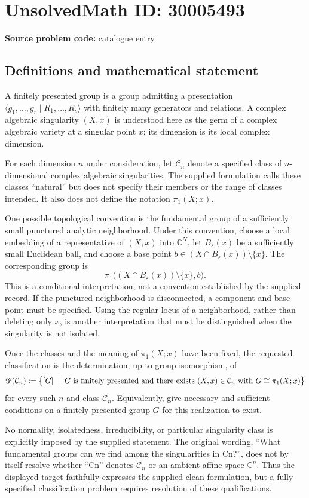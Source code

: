 \documentclass[11pt]{article}
\newcommand{\C}{\mathbb{C}}
\begin{document}
\section*{UnsolvedMath ID: 30005493}
\textbf{Source problem code:} catalogue entry
\subsection{Definitions and mathematical statement}
A finitely presented group is a group admitting a presentation $\langle g_1,\ldots,g_r\mid R_1,\ldots,R_s\rangle$ with finitely many generators and relations. A complex algebraic singularity $(X,x)$ is understood here as the germ of a complex algebraic variety at a singular point $x$; its dimension is its local complex dimension.

For each dimension $n$ under consideration, let $\mathcal C_n$ denote a specified class of $n$-dimensional complex algebraic singularities. The supplied formulation calls these classes ``natural'' but does not specify their members or the range of classes intended. It also does not define the notation $\pi_1(X;x)$.

One possible topological convention is the fundamental group of a sufficiently small punctured analytic neighborhood. Under this convention, choose a local embedding of a representative of $(X,x)$ into $\C^N$, let $B_\varepsilon(x)$ be a sufficiently small Euclidean ball, and choose a base point $b\in (X\cap B_\varepsilon(x))\setminus\{x\}$. The corresponding group is
\[
\pi_1\bigl((X\cap B_\varepsilon(x))\setminus\{x\},b\bigr).
\]
This is a conditional interpretation, not a convention established by the supplied record. If the punctured neighborhood is disconnected, a component and base point must be specified. Using the regular locus of a neighborhood, rather than deleting only $x$, is another interpretation that must be distinguished when the singularity is not isolated.

Once the classes and the meaning of $\pi_1(X;x)$ have been fixed, the requested classification is the determination, up to group isomorphism, of
\[
\mathscr G(\mathcal C_n)
:=\bigl\{[G]\;\bigm|\;G\text{ is finitely presented and there exists }(X,x)\in\mathcal C_n
\text{ with }G\cong\pi_1(X;x)\bigr\}
\]
for every such $n$ and class $\mathcal C_n$. Equivalently, give necessary and sufficient conditions on a finitely presented group $G$ for this realization to exist.

No normality, isolatedness, irreducibility, or particular singularity class is explicitly imposed by the supplied statement. The original wording, ``What fundamental groups can we find among the singularities in Cn?'', does not by itself resolve whether ``Cn'' denotes $\mathcal C_n$ or an ambient affine space $\C^n$. Thus the displayed target faithfully expresses the supplied clean formulation, but a fully specified classification problem requires resolution of these qualifications.
\end{document}
